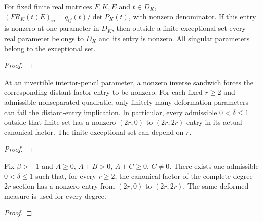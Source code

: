 \begin{supporting}
\begin{theorem}
\label{thm:finite-pencil-exceptions}
\leanok
For fixed finite real matrices $F,K,E$ and $t\in D_K$, $(FR_K(t)E)_{ij}=q_{ij}(t)/\det P_K(t)$, with nonzero denominator. If this entry is nonzero at one parameter in $D_K$, then outside a finite exceptional set every real parameter belongs to $D_K$ and its entry is nonzero. All singular parameters belong to the exceptional set.
\end{theorem}
\begin{proof}
\leanok
\end{proof}

\begin{theorem}
\label{thm:cofinite-quadratic-factors}
\leanok
At an invertible interior-pencil parameter, a nonzero inverse sandwich forces the corresponding distant factor entry to be nonzero. For each fixed $r\ge2$ and admissible nonseparated quadratic, only finitely many deformation parameters can fail the distant-entry implication. In particular, every admissible $0<\delta\le1$ outside that finite set has a nonzero $(2r,0)$ to $(2r,2r)$ entry in its actual canonical factor. The finite exceptional set can depend on $r$.
\end{theorem}
\begin{proof}
\leanok
\end{proof}
\end{supporting}


\begin{theorem}
\label{thm:fixed-quadratic-obstruction}
\leanok
Fix $\beta>-1$ and $A\ge0$, $A+B>0$, $A+C\ge0$, $C\ne0$. There exists one admissible $0<\delta\le1$ such that, for every $r\ge2$, the canonical factor of the complete degree-$2r$ section has a nonzero entry from $(2r,0)$ to $(2r,2r)$. The same deformed measure is used for every degree.
\end{theorem}
\begin{proof}
\leanok
\end{proof}

